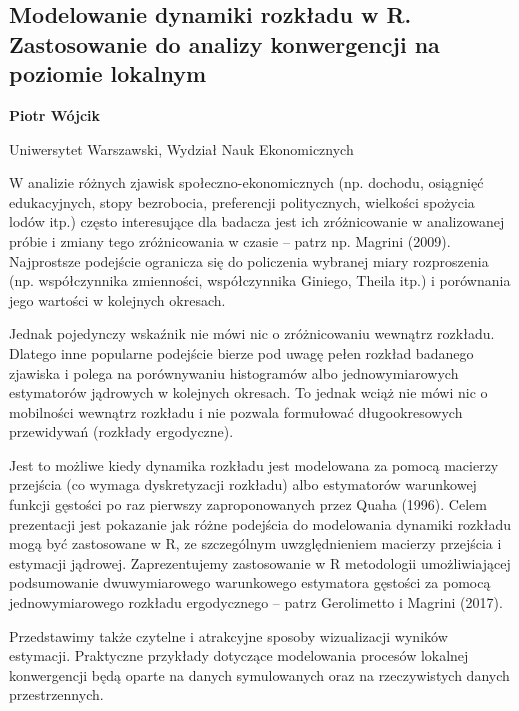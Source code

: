 \documentclass[\main/boa.tex]{subfiles}
\begin{document}
\subsection{Modelowanie dynamiki rozkładu w R. Zastosowanie do analizy konwergencji na poziomie lokalnym}

\begin{minipage}{0.915\textwidth}
	\centering
  {\bf {} Piotr Wójcik}
\end{minipage}


\begin{affiliations}
\begin{minipage}{0.915\textwidth}
\centering
Uniwersytet Warszawski, Wydział Nauk Ekonomicznych  \\[-2pt]
\end{minipage}
\end{affiliations}

\vskip 0.3cm

  W analizie różnych zjawisk społeczno-ekonomicznych (np. dochodu, osiągnięć edukacyjnych, stopy bezrobocia, preferencji politycznych, wielkości spożycia lodów itp.) często interesujące dla badacza jest ich zróżnicowanie w analizowanej próbie i zmiany tego zróżnicowania w czasie – patrz np. Magrini (2009). Najprostsze podejście ogranicza się do policzenia wybranej miary rozproszenia (np. współczynnika zmienności, współczynnika Giniego, Theila itp.) i porównania jego wartości w kolejnych okresach.
  
  Jednak pojedynczy wskaźnik nie mówi nic o zróżnicowaniu wewnątrz rozkładu. Dlatego inne popularne podejście bierze pod uwagę pełen rozkład badanego zjawiska i polega na porównywaniu histogramów albo jednowymiarowych estymatorów jądrowych w kolejnych okresach. To jednak wciąż nie mówi nic o mobilności wewnątrz rozkładu i nie pozwala formułować długookresowych przewidywań (rozkłady ergodyczne).
  
  Jest to możliwe kiedy dynamika rozkładu jest modelowana za pomocą macierzy przejścia (co wymaga dyskretyzacji rozkładu) albo estymatorów warunkowej funkcji gęstości po raz pierwszy zaproponowanych przez Quaha (1996). Celem prezentacji jest pokazanie jak różne podejścia do modelowania dynamiki rozkładu mogą być zastosowane w R, ze szczególnym uwzględnieniem macierzy przejścia i estymacji jądrowej. Zaprezentujemy zastosowanie w R metodologii umożliwiającej podsumowanie dwuwymiarowego warunkowego estymatora gęstości za pomocą jednowymiarowego rozkładu ergodycznego – patrz Gerolimetto i Magrini (2017).
  
  Przedstawimy także czytelne i atrakcyjne sposoby wizualizacji wyników estymacji. Praktyczne przykłady dotyczące modelowania procesów lokalnej konwergencji będą oparte na danych symulowanych oraz na rzeczywistych danych przestrzennych.
\end{document}
